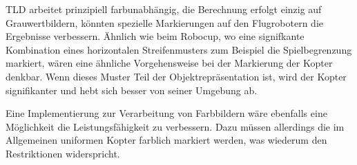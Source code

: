 		TLD arbeitet prinzipiell farbunabhängig, die Berechnung erfolgt einzig auf Grauwertbildern, könnten spezielle Markierungen auf den Flugrobotern die Ergebnisse verbessern. Ähnlich wie beim Robocup, wo eine signifkante Kombination eines horizontalen Streifenmusters zum Beispiel die Spielbegrenzung markiert, wären eine ähnliche Vorgehensweise bei der Markierung der Kopter denkbar. Wenn dieses Muster Teil der Objektrepräsentation ist, wird der Kopter signifikanter und hebt sich besser von seiner Umgebung ab.

		Eine Implementierung zur Verarbeitung von Farbbildern wäre ebenfalls eine Möglichkeit die Leistungsfähigkeit zu verbessern. Dazu müssen allerdings die im Allgemeinen uniformen Kopter farblich markiert werden, was wiederum den Restriktionen widerspricht.

